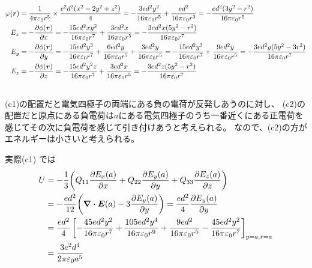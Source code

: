 \documentclass[../../sp_2022.tex]{subfiles}
\begin{document}
\subsection{}
\begin{equation}\begin{aligned}[b]
    \varphi(\vb*{r}) &= \frac{1}{4\pi\varepsilon_0r^5}\times \frac{e^2d^2(x^2-2y^2+z^2)}{4}
    =-\frac{3ed^2y^2}{16\pi\varepsilon_0r^5}+\frac{ed^2}{16\pi\varepsilon_0 r^3}
    = -\frac{ed^2(3y^2-r^2)}{16\pi\varepsilon_0r^5}\\
    E_x &= -\pdv{\phi(\vb*{r})}{x}
        = -\frac{15ed^2xy^2}{16\pi\varepsilon_0r^7}+\frac{3ed^2x}{16\pi\varepsilon_0 r^5}
        =-\frac{3ed^2x(5y^2-r^2)}{16\pi\varepsilon_0r^7}\\
    E_y &= -\pdv{\phi(\vb*{r})}{y}
        = -\frac{15ed^2y^3}{16\pi\varepsilon_0r^7}+\frac{6ed^2y}{16\pi\varepsilon_0r^5}
        +\frac{3ed^2y}{16\pi\varepsilon_0 r^5}
        = -\frac{15ed^2y^3}{16\pi\varepsilon_0r^7}+\frac{9ed^2y}{16\pi\varepsilon_0r^5}
        = -\frac{3ed^2y(5y^2-3r^2)}{16\pi\varepsilon_0r^7}\\
    E_z &= -\pdv{\phi(\vb*{r})}{z}
        = -\frac{15ed^2y^2z}{16\pi\varepsilon_0r^7}+\frac{3ed^2x}{16\pi\varepsilon_0 r^5}
        =-\frac{3ed^2z(5y^2-r^2)}{16\pi\varepsilon_0r^7}\\
\end{aligned}\end{equation}

\subsection{}
(c1)の配置だと電気四極子の両端にある負の電荷が反発しあうのに対し、
(c2)の配置だと原点にある負電荷は\(a\)にある電気四極子のうち一番近くにある正電荷を感じてその次に負電荷を感じて引き付けあうと考えられる。
なので、(c2)の方がエネルギーは小さいと考えられる。

実際(c1)
では
\begin{equation}\begin{aligned}[b]
    U &= -\frac{1}{3} \qty(Q_{11}\pdv{E_x(a)}{x}+Q_{22}\pdv{E_y(a)}{y}+Q_{33}\pdv{E_z(a)}{z})\\
    &= -\frac{ed^2}{12} \qty( \div \vb*{E}(a)-3\pdv{E_y(a)}{y})
    = \frac{ed^2}{4} \pdv{E_y(a)}{y}\\
    &= \frac{ed^2}{4} \left[-\frac{45ed^2y^2}{16\pi\varepsilon_0r^7}+\frac{105ed^2y^4}{16\pi\varepsilon_0r^9}
    +\frac{9ed^2}{16\pi\varepsilon_0r^5}-\frac{45ed^2y^2}{16\pi\varepsilon_0r^7}\right]_{y=a,r=a}\\
    &= \frac{3e^2d^4}{2\pi\varepsilon_0a^5}
\end{aligned}\end{equation}
\end{document}
